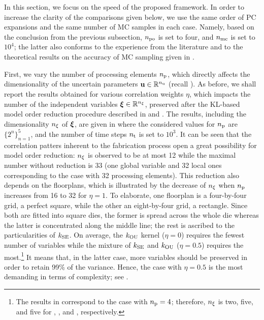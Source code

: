 In this section, we focus on the speed of the proposed framework.
In order to increase the clarity of the comparisons given below, we use the same order of PC expansions and the same number of MC samples in each case.
Namely, based on the conclusion from the previous subsection, ${n_\text{po}}$ is set to four, and ${n_\text{mc}}$ is set to $10^4$; the latter also conforms to the experience from the literature \cite{shen2009, bhardwaj2008, ghanta2006} and to the theoretical results on the accuracy of MC sampling given in \cite{diaz-emparanza2002}.

First, we vary the number of processing elements ${n_\text{p}}$, which directly affects the dimensionality of the uncertain parameters $\mathbf{u} \in \mathbb{R}^{n_\text{u}}$ (recall ).
As before, we shall report the results obtained for various correlation weights $\eta$, which impacts the number of the independent variables $\boldsymbol{\xi} \in \mathbb{R}^{n_\xi}$, preserved after the KL-based model order reduction procedure described in  and .
The results, including the dimensionality ${n_\xi}$ of $\boldsymbol{\xi}$, are given in  where the considered values for ${n_\text{p}}$ are $\{ 2^n \}_{n = 1}^5$, and the number of time steps ${n_\text{t}}$ is set to $10^3$.
It can be seen that the correlation patters inherent to the fabrication process \cite{cheng2011} open a great possibility for model order reduction: ${n_\xi}$ is observed to be at most 12 while the maximal number without reduction is 33 (one global variable and 32 local ones corresponding to the case with 32 processing elements).
This reduction also depends on the floorplans, which is illustrated by the decrease of ${n_\xi}$ when ${n_\text{p}}$ increases from 16 to 32 for $\eta = 1$.
To elaborate, one floorplan is a four-by-four grid, a perfect square, while the other an eight-by-four grid, a rectangle.
Since both are fitted into square dies, the former is spread across the whole die whereas the latter is concentrated along the middle line; the rest is ascribed to the particularities of $\fCorr_\SE$.
On average, the $\fCorr_\OU$ kernel ($\eta = 0$) requires the fewest number of variables while the mixture of $\fCorr_\SE$ and $\fCorr_\OU$ ($\eta = 0.5$) requires the most.\footnote{The results in  correspond to the case with ${n_\text{p}} = 4$; therefore, ${n_\xi}$ is two, five, and five for , , and , respectively.}
It means that, in the latter case, more variables should be preserved in order to retain 99\% of the variance.
Hence, the case with $\eta = 0.5$ is the most demanding in terms of complexity; see .

